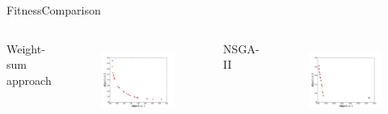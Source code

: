 \begin{frame}{Fitness}{Comparison}
\begin{columns}
	{ Weight-sum approach}
	\begin{figure}
		\centering
		\includegraphics[width=\linewidth]{figure/sim1-2obj/PF01-MORRT.png}
		\label{fig:sim:01:fit1}
	\end{figure}
	{ NSGA-II \newline}
	\begin{figure}
		\centering
		\includegraphics[width=\linewidth]{figure/sim3-2obj/PF03-MOPATH.png}
		\label{fig:sim:01:fit2}
	\end{figure}

\end{columns}
\end{frame}
